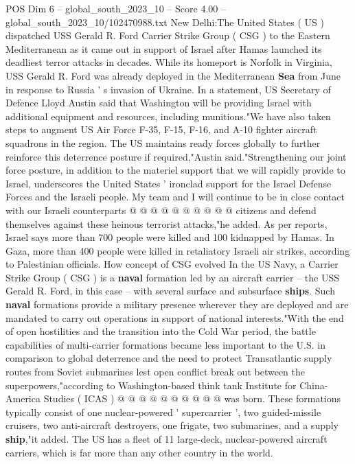 \begin{textsample}{POS Dim 6 – global\_south\_2023\_10 – Score 4.00 – global\_south\_2023\_10/102470988.txt}  \label{ex:f6_pos_250}
New Delhi:The United States ( US ) dispatched USS Gerald R.
Ford Carrier Strike Group ( CSG ) to the Eastern Mediterranean as it came out in support of Israel after Hamas launched its deadliest terror attacks in decades.
While its homeport is Norfolk in Virginia, USS Gerald R.
Ford was already deployed in the Mediterranean \textbf{Sea} from June in response to Russia ' s invasion of Ukraine.
In a statement, US Secretary of Defence Lloyd Austin said that Washington will be providing Israel with additional equipment and resources, including munitions."We have also taken steps to augment US Air Force F-35, F-15, F-16, and A-10 fighter aircraft squadrons in the region.
The US maintains ready forces globally to further reinforce this deterrence posture if required,"Austin said."Strengthening our joint force posture, in addition to the materiel support that we will rapidly provide to Israel, underscores the United States ' ironclad support for the Israel Defense Forces and the Israeli people.
My team and I will continue to be in close contact with our Israeli counterparts @ @ @ @ @ @ @ @ @ @ citizens and defend themselves against these heinous terrorist attacks,"he added.
As per reports, Israel says more than 700 people were killed and 100 kidnapped by Hamas.
In Gaza, more than 400 people were killed in retaliatory Israeli air strikes, according to Palestinian officials.
How concept of CSG evolved In the US Navy, a Carrier Strike Group ( CSG ) is a \textbf{naval} formation led by an aircraft carrier -- the USS Gerald R.
Ford, in this case -- with several surface and subsurface \textbf{ships}.
Such \textbf{naval} formations provide a military presence wherever they are deployed and are mandated to carry out operations in support of national interests."With the end of open hostilities and the transition into the Cold War period, the battle capabilities of multi-carrier formations became less important to the U.S. in comparison to global deterrence and the need to protect Transatlantic supply routes from Soviet submarines lest open conflict break out between the superpowers,"according to Washington-based think tank Institute for China-America Studies ( ICAS ) @ @ @ @ @ @ @ @ @ @ was born.
These formations typically consist of one nuclear-powered ' supercarrier ', two guided-missile cruisers, two anti-aircraft destroyers, one frigate, two submarines, and a supply \textbf{ship},"it added.
The US has a fleet of 11 large-deck, nuclear-powered aircraft carriers, which is far more than any other country in the world.

\end{textsample}
